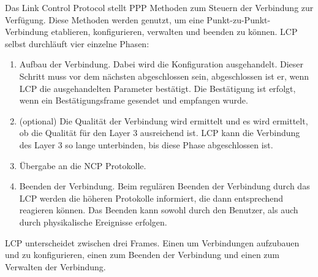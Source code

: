 \documentclass[12pt, a4paper, ngerman]{article}
\begin{document}
Das Link Control Protocol stellt PPP Methoden zum Steuern der Verbindung zur Verfügung. Diese Methoden werden genutzt, um eine Punkt-zu-Punkt-Verbindung  etablieren, konfigurieren, verwalten und  beenden zu können.
LCP selbst durchläuft vier einzelne Phasen:
\begin{enumerate}
	\item Aufbau der Verbindung. Dabei wird die Konfiguration ausgehandelt. Dieser Schritt muss vor dem nächsten abgeschlossen sein, abgeschlossen ist er, wenn LCP die ausgehandelten Parameter bestätigt. Die Bestätigung ist erfolgt, wenn ein Bestätigungsframe gesendet und empfangen wurde.
	\item (optional)  Die Qualität der Verbindung wird ermittelt und es wird ermittelt, ob die Qualität für den Layer 3 ausreichend ist. LCP kann die Verbindung des Layer 3 so lange unterbinden, bis diese Phase abgeschlossen ist. 
	\item Übergabe an die NCP Protokolle.   
	\item Beenden der Verbindung. Beim regulären Beenden der Verbindung durch das LCP werden die höheren Protokolle informiert, die dann entsprechend reagieren können. Das Beenden kann sowohl durch den Benutzer, als auch durch physikalische Ereignisse erfolgen. 
\end{enumerate}

LCP unterscheidet zwischen drei Frames. Einen um Verbindungen aufzubauen und zu konfigurieren, einen zum Beenden der Verbindung und einen zum Verwalten der Verbindung.
\end{document}
